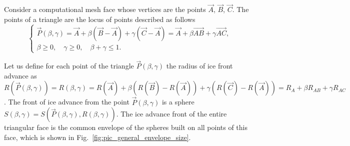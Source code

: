 \documentclass[
11pt,
tightenlines,
twoside,
onecolumn,
nofloats,
nobibnotes,
nofootinbib,
superscriptaddress,
noshowpacs,
centertags]
{revtex4-2}
\begin{document}
Consider a computational mesh face whose vertices are the points $\vec{A}$, $\vec{B}$, $\vec{C}$.
The points of a triangle are the locus of points described as
follows
\begin{equation}
\begin{cases}
\vec{P}(\beta, \gamma) = \vec{A} + \beta (\vec{B} - \vec{A}) + \gamma (\vec{C} -
\vec{A}) = \vec{A} + \beta \vec{AB} + \gamma \vec{AC}, \\
\beta \ge 0, \quad \gamma \ge 0, \quad \beta + \gamma \le 1.
\end{cases}
\end{equation}

Let us define for each point of the triangle $\vec{P}(\beta, \gamma)$ the radius of ice front advance as $R(\vec{P}(\beta, \gamma)) = R(\beta, \gamma) = R(\vec{A}) + \beta (R(\vec{B}) - R(\vec{A})) + \gamma (R(\vec{C}) - R(\vec{A} )) = R_A + \beta R_{AB} + \gamma R_{AC}$.
The front of ice advance from the point $\vec{P}(\beta, \gamma)$ is a sphere $S(\beta, \gamma) = S(\vec{P}(\beta, \gamma), R(\beta,\gamma))$.
The ice advance front of the entire triangular face is  the common
envelope of the spheres built on all points of this face, which is
shown in Fig.~\ref{fig:pic_general_envelope_size}.
\end{document}
